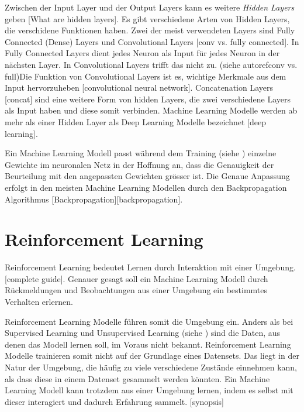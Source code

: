 Zwischen der Input Layer und der Output Layers kann es weitere \emph{Hidden
Layers} geben [What are hidden layers]. Es gibt verschiedene Arten von Hidden
Layers, die verschidene Funktionen haben. Zwei der meist verwendeten Layers sind
Fully Connected (Dense) Layers und Convolutional Layers [conv vs. fully
connected]. In Fully Connected Layers dient jedes Neuron als Input für jedes
Neuron in der nächsten Layer. In Convolutional Layers trifft das nicht zu.
(siehe autoref{conv vs. full})Die Funktion von Convolutional Layers ist es,
wichtige Merkmale aus dem Input hervorzuheben [convolutional neural network].
Concatenation Layers [concat] sind eine weitere Form von hidden Layers, die zwei
verschiedene Layers als Input haben und diese somit verbinden. Machine Learning
Modelle werden ab mehr als einer Hidden Layer als Deep Learning Modelle
bezeichnet [deep learning].


Ein Machine Learning Modell passt während dem Training (siehe
) einzelne Gewichte im neuronalen Netz in der
Hoffnung an, dass die Genauigkeit der Beurteilung mit den angepassten Gewichten
grösser ist. Die Genaue Anpassung erfolgt in den meisten Machine Learning
Modellen durch den Backpropagation Algorithmus [Backpropagation][backpropagation].

\section{Reinforcement Learning}\label{chap:t_rl}
Reinforcement Learning bedeutet Lernen durch Interaktion mit einer Umgebung.
[complete guide]. Genauer gesagt soll ein Machine Learning Modell durch
Rückmeldungen und Beobachtungen aus einer Umgebung ein bestimmtes Verhalten
erlernen.

Reinforcement Learning Modelle führen somit die Umgebung ein. Anders als bei
Supervised Learning und Unsupervised Learning (siehe ) sind
die Daten, aus denen das Modell lernen soll, im Voraus nicht bekannt.
Reinforcement Learning Modelle trainieren somit nicht auf der Grundlage eines
Datensets. Das liegt in der Natur der Umgebung, die häufig zu viele verschiedene
Zustände einnehmen kann, als dass diese in einem Datenset gesammelt werden
könnten. Ein Machine Learning Modell kann trotzdem aus einer Umgebung lernen,
indem es selbst mit dieser interagiert und dadurch Erfahrung sammelt. [synopsis]

